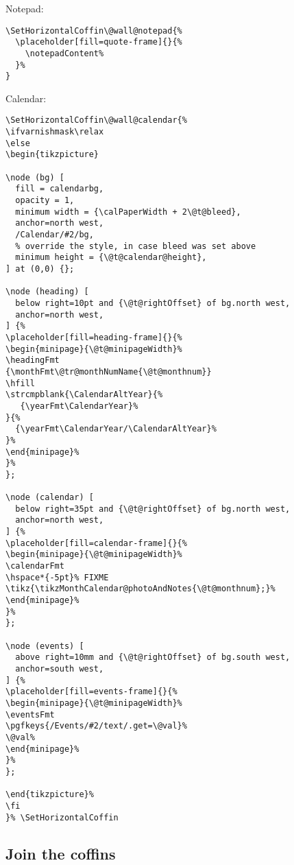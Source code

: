 \documentclass[11pt,oneside]{memoir-article}
\begin{document}
Notepad:

\begin{verbatim}
\SetHorizontalCoffin\@wall@notepad{%
  \placeholder[fill=quote-frame]{}{%
    \notepadContent%
  }%
}
\end{verbatim}

Calendar:

\begin{verbatim}
\SetHorizontalCoffin\@wall@calendar{%
\ifvarnishmask\relax
\else
\begin{tikzpicture}

\node (bg) [
  fill = calendarbg,
  opacity = 1,
  minimum width = {\calPaperWidth + 2\@t@bleed},
  anchor=north west,
  /Calendar/#2/bg,
  % override the style, in case bleed was set above
  minimum height = {\@t@calendar@height},
] at (0,0) {};

\node (heading) [
  below right=10pt and {\@t@rightOffset} of bg.north west,
  anchor=north west,
] {%
\placeholder[fill=heading-frame]{}{%
\begin{minipage}{\@t@minipageWidth}%
\headingFmt
{\monthFmt\@tr@monthNumName{\@t@monthnum}}
\hfill
\strcmpblank{\CalendarAltYear}{%
   {\yearFmt\CalendarYear}%
}{%
  {\yearFmt\CalendarYear/\CalendarAltYear}%
}%
\end{minipage}%
}%
};

\node (calendar) [
  below right=35pt and {\@t@rightOffset} of bg.north west,
  anchor=north west,
] {%
\placeholder[fill=calendar-frame]{}{%
\begin{minipage}{\@t@minipageWidth}%
\calendarFmt
\hspace*{-5pt}% FIXME
\tikz{\tikzMonthCalendar@photoAndNotes{\@t@monthnum};}%
\end{minipage}%
}%
};

\node (events) [
  above right=10mm and {\@t@rightOffset} of bg.south west,
  anchor=south west,
] {%
\placeholder[fill=events-frame]{}{%
\begin{minipage}{\@t@minipageWidth}%
\eventsFmt
\pgfkeys{/Events/#2/text/.get=\@val}%
\@val%
\end{minipage}%
}%
};

\end{tikzpicture}%
\fi
}% \SetHorizontalCoffin
\end{verbatim}

\subsection{Join the coffins}
\label{sec:org07343d5}
\end{document}
